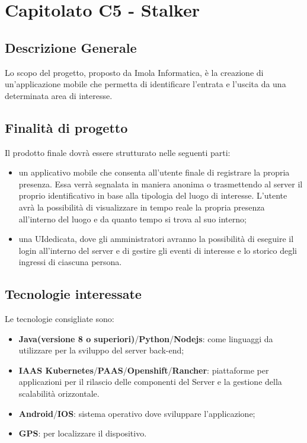 \section{Capitolato C5 - Stalker}
\subsection{Descrizione Generale}
Lo scopo del progetto, proposto da Imola Informatica, è la creazione di un'applicazione mobile che permetta di identificare l'entrata e l'uscita da una determinata area di interesse.
\subsection{Finalità di progetto}
Il prodotto finale dovrà essere strutturato nelle seguenti parti:
\begin{itemize}
	\item un applicativo mobile che consenta all'utente finale di registrare la propria presenza. Essa verrà segnalata in maniera anonima o trasmettendo al server il proprio identificativo in base alla tipologia del luogo di interesse. L'utente avrà la possibilità di visualizzare in tempo reale la propria presenza all'interno del luogo e da quanto tempo si trova al suo interno;
	\item una UI\glo dedicata, dove gli amministratori avranno la possibilità di eseguire il login all'interno del server e di gestire gli eventi di interesse e lo storico degli ingressi di ciascuna persona.
\end{itemize}
\subsection{Tecnologie interessate}
Le tecnologie consigliate sono:
\begin{itemize}
	\item \textbf{Java\glo(versione 8 o superiori)}/\textbf{Python\glo}/\textbf{Nodejs\glo}: come linguaggi da utilizzare per la sviluppo del server back-end;
	\item \textbf{IAAS Kubernetes\glo}/\textbf{PAAS\glo}/\textbf{Openshift\glo}/\textbf{Rancher\glo}: piattaforme per applicazioni per il rilascio delle componenti del Server e la gestione della scalabilità orizzontale.
	\item \textbf{Android\glo}/\textbf{IOS\glo}: sistema operativo dove sviluppare l'applicazione;
	\item \textbf{GPS\glo}: per localizzare il dispositivo.
\end{itemize}
